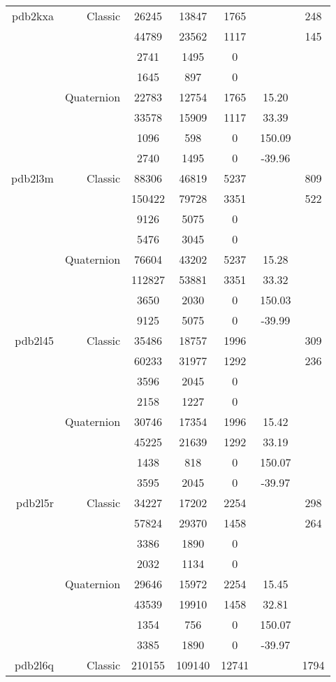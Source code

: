 \begin{xltabular}{\textwidth}{r|rcccSc}
pdb2kxa & Classic & 26245 & 13847 & 1765 & & 248 \\
& & 44789 & 23562 & 1117 & & 145 \\
& & 2741 & 1495 & 0 & & \\
& & 1645 & 897 & 0 & & \\
& Quaternion & 22783 & 12754 & 1765 & 15.20 & \\
& & 33578 & 15909 & 1117 & 33.39 & \\
& & 1096 & 598 & 0 & 150.09 & \\
& & 2740 & 1495 & 0 & -39.96 & \\ \addlinespace
pdb2l3m & Classic & 88306 & 46819 & 5237 & & 809 \\
& & 150422 & 79728 & 3351 & & 522 \\
& & 9126 & 5075 & 0 & & \\
& & 5476 & 3045 & 0 & & \\
& Quaternion & 76604 & 43202 & 5237 & 15.28 & \\
& & 112827 & 53881 & 3351 & 33.32 & \\
& & 3650 & 2030 & 0 & 150.03 & \\
& & 9125 & 5075 & 0 & -39.99 & \\ \addlinespace
pdb2l45 & Classic & 35486 & 18757 & 1996 & & 309 \\
& & 60233 & 31977 & 1292 & & 236 \\
& & 3596 & 2045 & 0 & & \\
& & 2158 & 1227 & 0 & & \\
& Quaternion & 30746 & 17354 & 1996 & 15.42 & \\
& & 45225 & 21639 & 1292 & 33.19 & \\
& & 1438 & 818 & 0 & 150.07 & \\
& & 3595 & 2045 & 0 & -39.97 & \\ \addlinespace
pdb2l5r & Classic & 34227 & 17202 & 2254 & & 298 \\
& & 57824 & 29370 & 1458 & & 264 \\
& & 3386 & 1890 & 0 & & \\
& & 2032 & 1134 & 0 & & \\
& Quaternion & 29646 & 15972 & 2254 & 15.45 & \\
& & 43539 & 19910 & 1458 & 32.81 & \\
& & 1354 & 756 & 0 & 150.07 & \\
& & 3385 & 1890 & 0 & -39.97 & \\ \addlinespace
pdb2l6q & Classic & 210155 & 109140 & 12741 & & 1794 \\

\end{xltabular}
